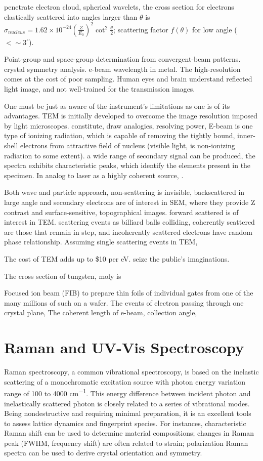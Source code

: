 penetrate electron cloud, spherical wavelets, the cross section for electrons elastically scattered into angles larger than $\theta$ is $\sigma_{nucleus}= 1.62\times10^{-24} (\frac{Z}{E_0})^2\cot^2\frac{\theta}{2}$; scattering factor $f(\theta)$ for low angle ($< \sim 3^{\circ}$). 

Point-group and space-group determination from convergent-beam patterns. crystal symmetry analysis. e-beam wavelength in metal. The high-resolution comes at the cost of poor sampling.  Human eyes and brain understand reflected light image, and not well-trained for the transmission images.

One must be just as aware of the instrument's limitations as one is of its advantages.   TEM is initially developed to overcome the image resolution imposed by light microscopes. constitute, draw analogies, resolving power, E-beam is one type of ionizing radiation, which is capable of removing the tightly bound, inner-shell electrons from attractive field of nucleus (visible light, is non-ionizing radiation to some extent). a wide range of secondary signal can be produced, the spectra exhibits characteristic peaks, which identify the elements present in the specimen. In analog to laser as a highly coherent source, . 

Both wave and particle approach, non-scattering is invisible, backscattered in large angle and secondary electrons are of interest in SEM, where they provide Z contrast and surface-sensitive, topographical images. forward scattered is of interest in TEM.  scattering events as billiard balls colliding, coherently scattered are those that remain in step, and incoherently scattered electrons have random phase relationship. Assuming single scattering events in TEM, 

The cost of TEM adds up to \$10 per eV. seize the public's imaginations. 

The cross section of tungsten, moly is 

Focused ion beam (FIB) to prepare thin foils of individual gates from one of the many millions of such on a wafer. The events of electron passing through one crystal plane, The coherent length of e-beam, collection angle, 

\fi
\section{Raman and UV-Vis Spectroscopy}

Raman spectroscopy, a common vibrational spectroscopy, is based on the inelastic scattering of a monochromatic excitation source with photon energy variation range of 100 to 4000 \si{cm^{-1}}. This energy difference between incident photon and inelastically scattered photon is closely related to a series of vibrational modes. Being nondestructive and requiring minimal preparation, it is an excellent tools to assess lattice dynamics and fingerprint species.\cite{McCreery2000} For instances, characteristic Raman shift can be used to determine material compositions; changes in Raman peak (FWHM, frequency shift) are often related to strain; polarization Raman spectra can be used to derive crystal orientation and symmetry. 

